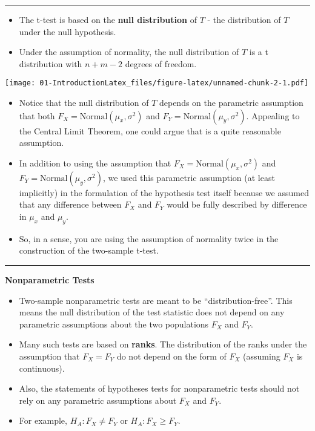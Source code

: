 \documentclass[]{book}
\begin{document}
\begin{center}\rule{0.5\linewidth}{\linethickness}\end{center}

\begin{itemize}
\item
  The t-test is based on the \textbf{null distribution} of \(T\) - the distribution of \(T\) under the null hypothesis.
\item
  Under the assumption of normality, the null distribution of \(T\) is a t distribution with \(n + m - 2\) degrees of freedom.
\end{itemize}

\texttt{[image: 01-IntroductionLatex\_files/figure-latex/unnamed-chunk-2-1.pdf]}

\begin{itemize}
\item
  Notice that the null distribution of \(T\) depends on the parametric assumption that both \(F_{X} = \textrm{Normal}(\mu_{x}, \sigma^{2})\)
  and \(F_{Y} = \textrm{Normal}(\mu_{y}, \sigma^{2})\). Appealing to the Central Limit Theorem, one could
  argue that is a quite reasonable assumption.
\item
  In addition to using the assumption that \(F_{X} = \textrm{Normal}(\mu_{x}, \sigma^{2})\) and \(F_{Y} = \textrm{Normal}(\mu_{y}, \sigma^{2})\), we used this parametric assumption (at least implicitly) in the formulation of the hypothesis test itself because we assumed that any difference between \(F_{X}\) and \(F_{Y}\) would be fully described by difference in \(\mu_{x}\) and \(\mu_{y}\).
\item
  So, in a sense, you are using the assumption of normality twice in the construction of the two-sample t-test.
\end{itemize}

\begin{center}\rule{0.5\linewidth}{\linethickness}\end{center}

\textbf{Nonparametric Tests}

\begin{itemize}
\item
  Two-sample nonparametric tests are meant to be ``distribution-free''. This means the null distribution of the test statistic does not depend on any parametric
  assumptions about the two populations \(F_{X}\) and \(F_{Y}\).
\item
  Many such tests are based on \textbf{ranks}. The distribution of the ranks under the assumption that \(F_{X} = F_{Y}\) do
  not depend on the form of \(F_{X}\) (assuming \(F_{X}\) is continuous).
\item
  Also, the statements of hypotheses tests for nonparametric tests should not rely on any parametric assumptions about \(F_{X}\) and \(F_{Y}\).
\item
  For example, \(H_{A}: F_{X} \neq F_{Y}\) or \(H_{A}: F_{X} \geq F_{Y}\).
\end{itemize}
\end{document}
